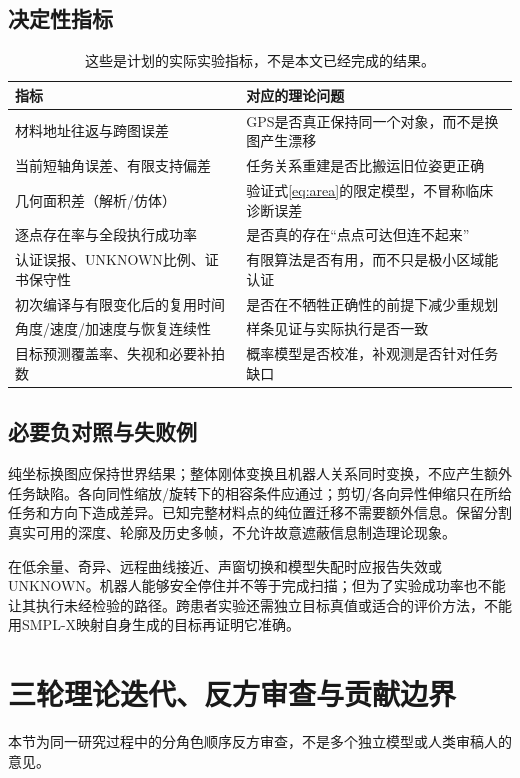 \documentclass[UTF8,11pt,a4paper,fontset=fandol]{ctexart}
\numberwithin{equation}{section}
\theoremstyle{definition}
\begin{document}
\subsection{决定性指标}
\begin{table}[H]\centering\small
\begin{tabularx}{\textwidth}{p{36mm}Y}\toprule
指标 & 对应的理论问题\\\midrule
材料地址往返与跨图误差 & GPS是否真正保持同一个对象，而不是换图产生漂移\\
当前短轴角误差、有限支持偏差 & 任务关系重建是否比搬运旧位姿更正确\\
几何面积差（解析/仿体） & 验证式\eqref{eq:area}的限定模型，不冒称临床诊断误差\\
逐点存在率与全段执行成功率 & 是否真的存在“点点可达但连不起来”\\
认证误报、UNKNOWN比例、证书保守性 & 有限算法是否有用，而不只是极小区域能认证\\
初次编译与有限变化后的复用时间 & 是否在不牺牲正确性的前提下减少重规划\\
角度/速度/加速度与恢复连续性 & 样条见证与实际执行是否一致\\
目标预测覆盖率、失视和必要补拍数 & 概率模型是否校准，补观测是否针对任务缺口\\\bottomrule
\end{tabularx}
\caption{这些是计划的实际实验指标，不是本文已经完成的结果。}
\end{table}

\subsection{必要负对照与失败例}
纯坐标换图应保持世界结果；整体刚体变换且机器人关系同时变换，不应产生额外任务缺陷。各向同性缩放/旋转下的相容条件应通过；剪切/各向异性伸缩只在所给任务和方向下造成差异。已知完整材料点的纯位置迁移不需要额外信息。保留分割真实可用的深度、轮廓及历史多帧，不允许故意遮蔽信息制造理论现象。

在低余量、奇异、远程曲线接近、声窗切换和模型失配时应报告失效或UNKNOWN。机器人能够安全停住并不等于完成扫描；但为了实验成功率也不能让其执行未经检验的路径。跨患者实验还需独立目标真值或适合的评价方法，不能用SMPL-X映射自身生成的目标再证明它准确。

\section{三轮理论迭代、反方审查与贡献边界}
本节为同一研究过程中的分角色顺序反方审查，不是多个独立模型或人类审稿人的意见。
\end{document}
